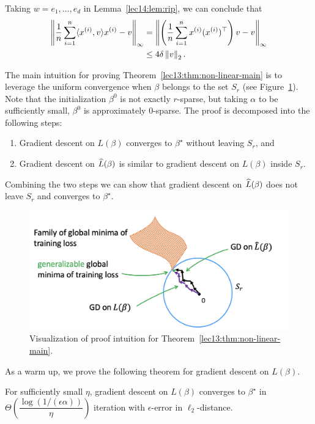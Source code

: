 \begin{corollary}\label{lec14:cor:rip}
    Taking $w = e_1, \dots, e_d$ in Lemma~\ref{lec14:lem:rip}, we can conclude that
    \begin{align}
        \left\| \frac{1}{n} \sum_{i=1}^n \langle x^{(i)}, v\rangle x^{(i)} - v \right\|_\infty &= \left\| \left(\frac{1}{n} \sum_{i=1}^n x^{(i)}(x^{(i)})^\top \right)v - v \right\|_\infty \\
        &\leq 4\delta \left\|v\right\|_2.
    \end{align}
\end{corollary}


The main intuition for proving Theorem~\ref{lec13:thm:non-linear-main} is to leverage the uniform convergence when $\beta$ belongs to the set $S_r$ (see Figure~\ref{lec13:fig:uc-sr}). Note that the initialization $\beta^0$ is not exactly $r$-sparse, but taking $\alpha$ to be sufficiently small, $\beta^0$ is approximately $0$-sparse. The proof is decomposed into the following steps:

\begin{enumerate}
    \item Gradient descent on $L(\beta)$ converges to $\beta^\star$ without leaving $S_r$, and
    \item Gradient descent on $\widehat{L}(\beta)$ is similar to gradient descent on $L(\beta)$ inside $S_r$.
\end{enumerate}

Combining the two steps we can show that gradient descent on $\widehat{L}(\beta)$ does not leave $S_r$ and converges to $\beta^\star.$

\begin{figure}
\centering
\includegraphics[width=.7\linewidth]{figures/uc-sr.png}
\caption{Visualization of proof intuition for Theorem~\ref{lec13:thm:non-linear-main}.}
\label{lec13:fig:uc-sr}
\end{figure}

As a warm up, we prove the following theorem for gradient descent on $L(\beta).$
\begin{theorem}
For sufficiently small $\eta$, gradient descent on $L(\beta)$ converges to $\beta^\star$ in $\Theta\left(\dfrac{\log (1/ (\epsilon\alpha) )}{\eta}\right)$ iteration with $\epsilon$-error in $\ell_2$-distance.
\end{theorem}

